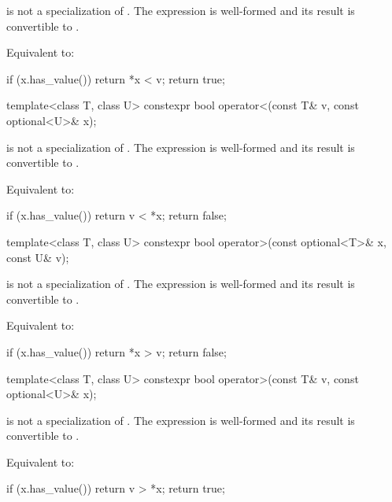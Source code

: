 \begin{itemdescr}
\pnum
\constraints
{} is not a specialization of .
The expression  is well-formed and
its result is convertible to .

\pnum
\effects
Equivalent to:
\begin{codeblock}
if (x.has_value())
  return *x < v;
return true;
\end{codeblock}
\end{itemdescr}

%
\begin{itemdecl}
template<class T, class U> constexpr bool operator<(const T& v, const optional<U>& x);
\end{itemdecl}

\begin{itemdescr}
\pnum
\constraints
{} is not a specialization of .
The expression  is well-formed and
its result is convertible to .

\pnum
\effects
Equivalent to:
\begin{codeblock}
if (x.has_value())
  return v < *x;
return false;
\end{codeblock}
\end{itemdescr}

%
\begin{itemdecl}
template<class T, class U> constexpr bool operator>(const optional<T>& x, const U& v);
\end{itemdecl}

\begin{itemdescr}
\pnum
\constraints
{} is not a specialization of .
The expression  is well-formed and
its result is convertible to .

\pnum
\effects
Equivalent to:
\begin{codeblock}
if (x.has_value())
  return *x > v;
return false;
\end{codeblock}
\end{itemdescr}

%
\begin{itemdecl}
template<class T, class U> constexpr bool operator>(const T& v, const optional<U>& x);
\end{itemdecl}

\begin{itemdescr}
\pnum
\constraints
{} is not a specialization of .
The expression  is well-formed and
its result is convertible to .

\pnum
\effects
Equivalent to:
\begin{codeblock}
if (x.has_value())
  return v > *x;
return true;
\end{codeblock}
\end{itemdescr}

